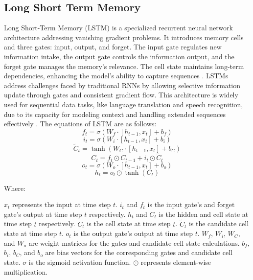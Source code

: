 \documentclass[sn-mathphys,Numbered]{sn-jnl}
\theoremstyle{thmstyleone}
\theoremstyle{thmstyletwo}
\theoremstyle{thmstylethree}
\begin{document}
\subsection{Long Short Term Memory}
Long Short-Term Memory (LSTM) is a specialized recurrent neural network architecture addressing vanishing gradient problems. It introduces memory cells and three gates: input, output, and forget. The input gate regulates new information intake, the output gate controls the information output, and the forget gate manages the memory's relevance. The cell state maintains long-term dependencies, enhancing the model's ability to capture sequences \cite{guillen2020deep}. LSTMs address challenges faced by traditional RNNs by allowing selective information update through gates and consistent gradient flow. This architecture is widely used for sequential data tasks, like language translation and speech recognition, due to its capacity for modeling context and handling extended sequences effectively \cite{qiu2021river}. The equations of LSTM are as follows:
\begin{equation}
f_t = \sigma(W_f \cdot [h_{t-1}, x_t] + b_f)
\end{equation}
\begin{equation}
i_t = \sigma(W_i \cdot [h_{t-1}, x_t] + b_i)
\end{equation}
\begin{equation}
\tilde{C}_t = \tanh(W_C \cdot [h_{t-1}, x_t] + b_C)
\end{equation}
\begin{equation}
C_t = f_t \odot C_{t-1} + i_t \odot \tilde{C}_t
\end{equation}
\begin{equation}
o_t = \sigma(W_o \cdot [h_{t-1}, x_t] + b_o)
\end{equation}
\begin{equation}
h_t = o_t \odot \tanh(C_t)
\end{equation}


Where:

\(x_t\) represents the input at time step \(t\).
 \(i_t\) and \(f_t\) is the input gate's and forget gate's output at time step \(t\) respectively.
 \(h_t\) and \(C_t\) is the hidden and cell state at time step \(t\) respectively.
 \(C_t\) is the cell state at time step \(t\).
 \(\tilde{C}_t\) is the candidate cell state at time step \(t\).
 \(o_t\) is the output gate's output at time step \(t\).
 \(W_f\), \(W_i\), \(W_C\), and \(W_o\) are weight matrices for the gates and candidate cell state calculations.
 \(b_f\), \(b_i\), \(b_C\), and \(b_o\) are bias vectors for the corresponding gates and candidate cell state.
 \(\sigma\) is the sigmoid activation function.
 \(\odot\) represents element-wise multiplication.
\end{document}
